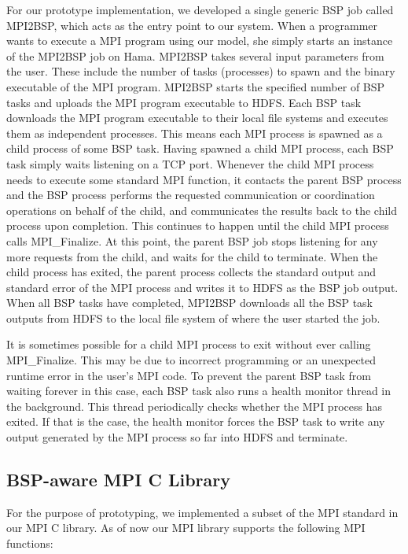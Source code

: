 \documentclass[conference,10pt] {IEEEtran}
\begin{document}
For our prototype implementation, we developed a single generic BSP job called MPI2BSP, which acts as the entry point to our system. When a programmer wants to execute a MPI program using our model, she simply starts an instance of the MPI2BSP job on Hama. MPI2BSP takes several input parameters from the user. These include the number of tasks (processes) to spawn and the binary executable of the MPI program. MPI2BSP starts the specified number of BSP tasks and uploads the MPI program executable to HDFS. Each BSP task downloads the MPI program executable to their local file systems and executes them as independent processes. This means each MPI process is spawned as a child process of some BSP task. Having spawned a child MPI process, each BSP task simply waits listening on a TCP port. Whenever the child MPI process needs to execute some standard MPI function, it contacts the parent BSP process and the BSP process performs the requested communication or coordination operations on behalf of the child, and communicates the results back to the child process upon completion. This continues to happen until the child MPI process calls MPI\_Finalize. At this point, the parent BSP job stops listening for any more requests from the child, and waits for the child to terminate. When the child process has exited, the parent process collects the standard output and standard error of the MPI process and writes it to HDFS as the BSP job output. When all BSP tasks have completed, MPI2BSP downloads all the BSP task outputs from HDFS to the local file system of where the user started the job.

It is sometimes possible for a child MPI process to exit without ever calling MPI\_Finalize. This may be due to incorrect programming or an unexpected runtime error in the user's MPI code. To prevent the parent BSP task from waiting forever in this case, each BSP task also runs a health monitor thread in the background. This thread periodically checks whether the MPI process has exited. If that is the case, the health monitor forces the BSP task to write any output generated by the MPI process so far into HDFS and terminate.

\subsection{BSP-aware MPI C Library}
For the purpose of prototyping, we implemented a subset of the MPI standard in our MPI C library. As of now our MPI library supports the following MPI functions:
\end{document}

